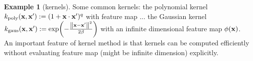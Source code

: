 \documentclass[
10pt,
aps,
pra,
linenumbers,
floatfix,
]{revtex4-2}
\theoremstyle{plain}
\theoremstyle{definition}
\newtheorem{example}{Example}
\newcommand{\kernel}{k}
\newcommand{\shadow}{\text{shadow}}
\newcommand{\U}{\hat{U}}
\begin{document}
\begin{example}[kernels]
	Some common kernels: 
	the polynomial kernel $\kernel_{\text{poly}}(\vbx,\vbx') := (1+\vbx\cdot\vbx')^q$ with feature map ...
	the Gaussian kernel
	$\kernel_{\text{gaus}}(\vbx,\vbx') := \exp(-\frac{\norm{\vbx-\vbx'}^2}{2\beta})$ 
	with an infinite dimensional feature map $\phi(\vb{x})$.
	An important feature of kernel method is that kernels can be computed efficiently without evaluating feature map (might be infinite dimension) explicitly.




\end{example}
\end{document}
